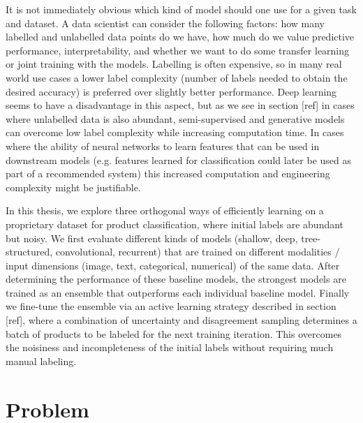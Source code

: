 It is not immediately obvious  which kind of model should one use for a given task and dataset.
A data scientist can consider the following factors:  how many labelled and unlabelled data points do we have,  how much do we value predictive performance, interpretability, and whether we want to do some transfer learning or joint training with the models.
Labelling is often expensive, so in many real world use cases a lower label complexity (number of labels needed to obtain the desired accuracy) is preferred over slightly better performance.
Deep learning seems to have a disadvantage in this aspect, but as we see in section [ref] in cases where unlabelled data is also abundant, semi-supervised and generative models can overcome low label complexity while increasing computation time.
In cases where the ability of neural networks to learn features that can be used in downstream models (e.g. features learned for classification could later be used as part of a recommended system) this increased computation and engineering complexity might be justifiable.


In this thesis, we explore three orthogonal ways of efficiently learning on a proprietary dataset for product classification, where initial labels are abundant but noisy. We first evaluate different kinds of models (shallow, deep, tree-structured, convolutional, recurrent) that are trained on different modalities / input dimensions (image, text, categorical, numerical) of the same data. After determining the performance of these baseline models, the strongest models are trained as an ensemble that outperforms each individual baseline model. Finally we fine-tune the ensemble via an active learning strategy described in section [ref], where a combination of uncertainty and disagreement sampling determines a batch of products to be labeled for the next training iteration. This overcomes the noisiness and incompleteness of the initial labels without requiring much manual labeling.

\section{Problem}

